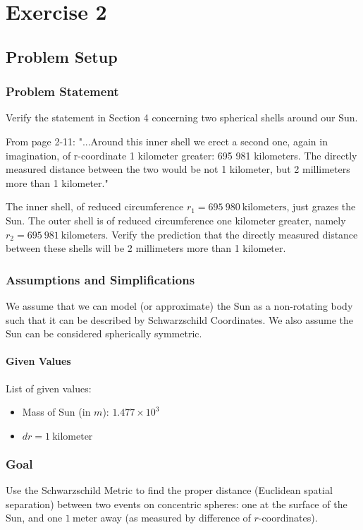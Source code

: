\documentclass[]{report}
\begin{document}
  \chapter{Exercise 2}
    \section{Problem Setup}
      \subsection{Problem Statement}
        Verify the statement in Section 4 concerning two spherical shells around our Sun.

        From page 2-11: "...Around this inner shell we erect a second one, again in imagination, of r-coordinate 1 kilometer greater: 695 981 kilometers. The directly measured distance between the two would be not 1 kilometer, but 2 millimeters more than 1 kilometer."

        The inner shell, of reduced circumference $r_1=695\ 980\ \text{kilometers}$, just grazes the Sun. The outer shell is of reduced circumference one kilometer greater, namely $r_2=695\ 981\ \text{kilometers}$. Verify the prediction that the directly measured distance between these shells will be 2 millimeters more than 1 kilometer.

      \subsection{Assumptions and Simplifications}
        We assume that we can model (or approximate) the Sun as a non-rotating body such that it can be described by Schwarzschild Coordinates. We also assume the Sun can be considered spherically symmetric.

        \subsubsection{Given Values}
          List of given values:
          \begin{itemize}
            \item Mass of Sun (in $m$): $1.477\times10^3$
            \item $dr = 1\ \text{kilometer}$
            \end{itemize}

      \subsection{Goal}
        Use the Schwarzschild Metric to find the proper distance (Euclidean spatial separation) between two events on concentric spheres: one at the surface of the Sun, and one $1\ \text{meter}$ away (as measured by difference of $r$-coordinates).
\end{document}
